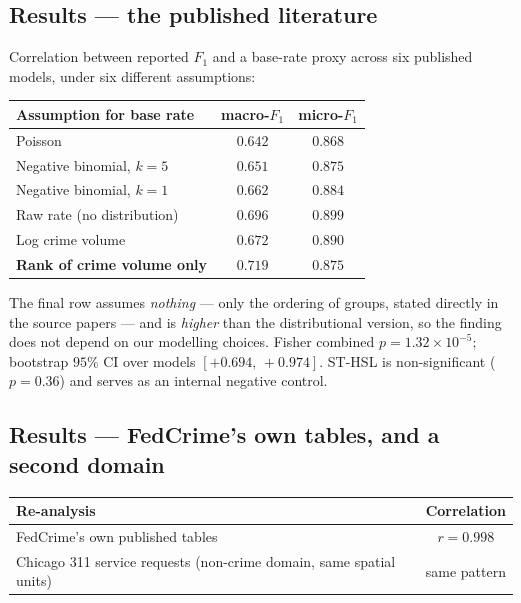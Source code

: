 \documentclass[11pt,a4paper]{article}
\begin{document}
\subsection{Results --- the published literature}
Correlation between reported $F_1$ and a base-rate proxy across six published
models, under six different assumptions:
\begin{center}
\begin{tabular}{lcc}
\toprule
Assumption for base rate & macro-$F_1$ & micro-$F_1$ \\
\midrule
Poisson & $0.642$ & $0.868$ \\
Negative binomial, $k=5$ & $0.651$ & $0.875$ \\
Negative binomial, $k=1$ & $0.662$ & $0.884$ \\
Raw rate (no distribution) & $0.696$ & $0.899$ \\
Log crime volume & $0.672$ & $0.890$ \\
\textbf{Rank of crime volume only} & $\mathbf{0.719}$ & $\mathbf{0.875}$ \\
\bottomrule
\end{tabular}
\end{center}
\noindent The final row assumes \emph{nothing} --- only the ordering of groups,
stated directly in the source papers --- and is \emph{higher} than the
distributional version, so the finding does not depend on our modelling choices.
Fisher combined $p = 1.32\times10^{-5}$; bootstrap $95\%$ CI over models
$[+0.694,\,+0.974]$. ST-HSL is non-significant ($p = 0.36$) and serves as an
internal negative control.

\subsection{Results --- FedCrime's own tables, and a second domain}
\begin{center}
\begin{tabular}{lc}
\toprule
Re-analysis & Correlation \\
\midrule
FedCrime's own published tables & $r = 0.998$ \\
Chicago 311 service requests (non-crime domain, same spatial units) & same pattern \\
\bottomrule
\end{tabular}
\end{center}
\end{document}
